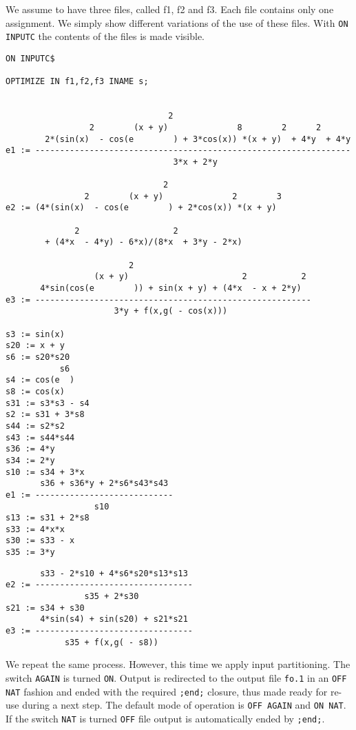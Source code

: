 We assume to have three files, called f1, f2 and f3. Each file contains only
one assignment. We simply show different variations of the use of these files.
With {\tt ON INPUTC} the contents of the files is made visible.
{\small
\begin{verbatim}
ON INPUTC$

OPTIMIZE IN f1,f2,f3 INAME s;
 

                                 2
                 2        (x + y)              8        2      2
        2*(sin(x)  - cos(e        ) + 3*cos(x)) *(x + y)  + 4*y  + 4*y
e1 := ----------------------------------------------------------------
                                  3*x + 2*y

                                2
                2        (x + y)              2        3
e2 := (4*(sin(x)  - cos(e        ) + 2*cos(x)) *(x + y)

              2                   2
        + (4*x  - 4*y) - 6*x)/(8*x  + 3*y - 2*x)

                         2
                  (x + y)                       2           2
       4*sin(cos(e        )) + sin(x + y) + (4*x  - x + 2*y)
e3 := --------------------------------------------------------
                      3*y + f(x,g( - cos(x)))

s3 := sin(x)
s20 := x + y
s6 := s20*s20
           s6
s4 := cos(e  )
s8 := cos(x)
s31 := s3*s3 - s4
s2 := s31 + 3*s8
s44 := s2*s2
s43 := s44*s44
s36 := 4*y
s34 := 2*y
s10 := s34 + 3*x
       s36 + s36*y + 2*s6*s43*s43
e1 := ----------------------------
                  s10
s13 := s31 + 2*s8
s33 := 4*x*x
s30 := s33 - x
s35 := 3*y
\end{verbatim}}
\newpage
{\small
\begin{verbatim}
       s33 - 2*s10 + 4*s6*s20*s13*s13
e2 := --------------------------------
                s35 + 2*s30
s21 := s34 + s30
       4*sin(s4) + sin(s20) + s21*s21
e3 := --------------------------------
            s35 + f(x,g( - s8))

\end{verbatim}}

We repeat the same process. However, this time we apply input partitioning.
The switch {\tt AGAIN} is turned {\tt ON}. Output is redirected to the
output file {\tt fo.1} in an {\tt OFF NAT} fashion and ended with the required
{\tt ;end;} closure, thus made ready for re-use during a next step. 
The default mode of operation is {\tt OFF AGAIN} and {\tt ON NAT}. If the
switch {\tt NAT} is turned {\tt OFF} file output is automatically ended
by {\tt ;end;}.

